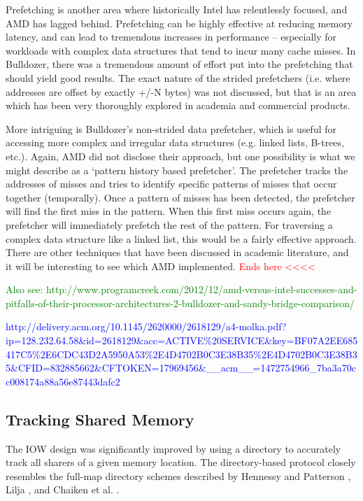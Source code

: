 		Prefetching is another area where historically Intel has relentlessly focused, and AMD has lagged behind. Prefetching can be highly effective at reducing memory latency, and can lead to tremendous increases in performance – especially for workloads with complex data structures that tend to incur many cache misses. In Bulldozer, there was a tremendous amount of effort put into the prefetching that should yield good results. The exact nature of the strided prefetchers (i.e. where addresses are offset by exactly +/-N bytes) was not discussed, but that is an area which has been very thoroughly explored in academia and commercial products.
		
		More intriguing is Bulldozer’s non-strided data prefetcher, which is useful for accessing more complex and irregular data structures (e.g. linked lists, B-trees, etc.). Again, AMD did not disclose their approach, but one possibility is what we might describe as a ‘pattern history based prefetcher’. The prefetcher tracks the addresses of misses and tries to identify specific patterns of misses that occur together (temporally). Once a pattern of misses has been detected, the prefetcher will find the first miss in the pattern. When this first miss occurs again, the prefetcher will immediately prefetch the rest of the pattern. For traversing a complex data structure like a linked list, this would be a fairly effective approach. There are other techniques that have been discussed in academic literature, and it will be interesting to see which AMD implemented.
		\textcolor{red}{Ends here <<<<}
		
		\textcolor{green}{Also see: http://www.programcreek.com/2012/12/amd-versus-intel-successes-and-pitfalls-of-their-processor-architectures-2-bulldozer-and-sandy-bridge-comparison/}
		
		\textcolor{blue}{http://delivery.acm.org/10.1145/2620000/2618129/a4-molka.pdf?ip=128.232.64.58\&id=2618129\&acc=ACTIVE\%20SERVICE\&key=BF07A2EE685417C5\%2E6CDC43D2A5950A53\%2E4D4702B0C3E38B35\%2E4D4702B0C3E38B35\&CFID=832885662\&CFTOKEN=17969456\&\_\_acm\_\_=1472754966\_7ba3a70cc008174a88a56e87443dafc2}
		
		
		
		
		\subsection{Tracking Shared Memory}
			The IOW design was significantly improved by using a directory to accurately track all sharers of a given memory location. The directory-based protocol closely resembles the full-map directory schemes described by Hennessy and Patterson \cite{Hennessy06}, Lilja \cite{Lilja93}, and Chaiken et al. \cite{Chaiken90}. 
			
